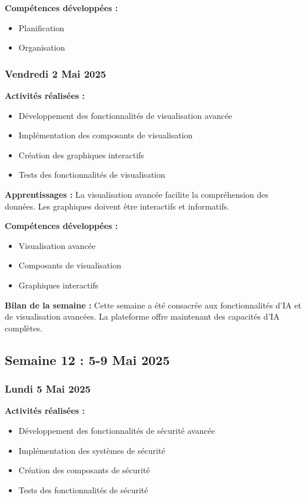 \documentclass[12pt,a4paper]{article}
\begin{document}
\textbf{Compétences développées :}
\begin{itemize}
    \item Planification
    \item Organisation
\end{itemize}

\subsubsection{Vendredi 2 Mai 2025}
\textbf{Activités réalisées :}
\begin{itemize}
    \item Développement des fonctionnalités de visualisation avancée
    \item Implémentation des composants de visualisation
    \item Création des graphiques interactifs
    \item Tests des fonctionnalités de visualisation
\end{itemize}

\textbf{Apprentissages :}
La visualisation avancée facilite la compréhension des données. Les graphiques doivent être interactifs et informatifs.

\textbf{Compétences développées :}
\begin{itemize}
    \item Visualisation avancée
    \item Composants de visualisation
    \item Graphiques interactifs
\end{itemize}

\textbf{Bilan de la semaine :}
Cette semaine a été consacrée aux fonctionnalités d'IA et de visualisation avancées. La plateforme offre maintenant des capacités d'IA complètes.

\clearpage
\subsection{Semaine 12 : 5-9 Mai 2025}

\subsubsection{Lundi 5 Mai 2025}
\textbf{Activités réalisées :}
\begin{itemize}
    \item Développement des fonctionnalités de sécurité avancée
    \item Implémentation des systèmes de sécurité
    \item Création des composants de sécurité
    \item Tests des fonctionnalités de sécurité
\end{itemize}
\end{document}

